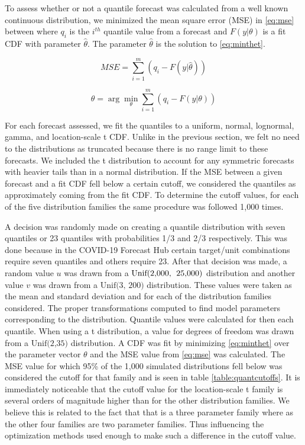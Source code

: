 \documentclass[11pt,notitlepage]{isuthesis}
\begin{document}
To assess whether or not a quantile forecast was calculated from a well
known continuous distribution, we minimized the mean square error (MSE)  
in \eqref{eq:mse} between where $q_i$ is
the $i^{th}$ quantile value from a forecast and $F(y| \theta)$ is a fit CDF with 
parameter $\hat{\theta}$. The parameter $\hat{\theta}$ is the solution to 
\eqref{eq:minthet}.

\begin{equation}
  MSE = \sum_{i=1}^m (q_i - F(y| \hat{\theta}))
  \label{eq:mse}
\end{equation}

\begin{equation}
  \hat{\theta} = \arg\min_{\theta} \sum_{i=1}^m (q_i - F(y| \theta))
  \label{eq:minthet}
\end{equation}




For each forecast assessed, we fit the quantiles to a uniform, normal, 
lognormal,
gamma, and location-scale t CDF. Unlike in the previous section, we felt no need
to the distributions as truncated because there is no range limit to these 
forecasts. We included the t distribution to account for any
symmetric forecasts with heavier tails than in a normal distribution.
If the MSE between a given forecast and a fit CDF fell below a certain cutoff,
we considered the quantiles as approximately coming from the fit CDF. To
determine the cutoff values, for each of the five distribution families the same
procedure was followed 1,000 times. 

A decision was randomly made on creating a quantile distribution with seven 
quantiles or 23
quantiles with probabilities 1/3 and 2/3 respectively. This was done because 
in the COVID-19 Forecast Hub certain target/unit combinations require 
seven quantiles and others 
require 23. After that decision was made, a random value $u$ was drawn from
a $\mbox{Unif(2,000,\; 25,000)}$ distribution and another value $v$ was drawn
from a $\mbox{Unif(3, 200)}$ distribution. These values were taken as the mean 
and
standard deviation and for each of the distribution families considered. The
proper transformations computed to find model parameters corresponding to the 
distribution. Quantile values were calculated for then each quantile. When using 
a t distribution, a value for degrees of freedom was drawn from a 
$\mbox{Unif(2,35)}$ distribution. A CDF
was fit by minimizing \eqref{eq:minthet} over the parameter
vector $\theta$ and the MSE value from \eqref{eq:mse} was 
calculated. The MSE value for which 95\% of the 1,000 simulated distributions
fell below was considered the cutoff for that family and is seen in table 
\ref{table:quantcutoffs}. It is immediately noticeable that the cutoff value 
for the location-scale t family is several orders of magnitude higher than for 
the other distribution families. We believe this is related to the fact that 
that is a three parameter family where as the other four families are two 
parameter families. Thus influencing the optimization methods used enough to 
make such a difference in the cutoff value. 
\end{document}
